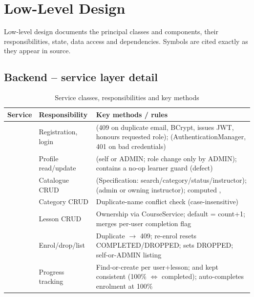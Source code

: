 \section{Low-Level Design}
\label{sec:low-level-design}

Low-level design documents the principal classes and components, their responsibilities, state, data access and dependencies. Symbols are cited exactly as they appear in source.

\subsection{Backend -- service layer detail}

\begin{table}[H]
\centering
\caption{Service classes, responsibilities and key methods}
\label{tab:lld-services}
\begin{tabular}{@{}L{3.0cm}L{5.4cm}L{5.8cm}@{}}
\toprule
\textbf{Service} & \textbf{Responsibility} & \textbf{Key methods / rules} \\
\midrule
{} & Registration, login &  (409 on duplicate email, BCrypt, issues JWT, honours requested role);  (AuthenticationManager, 401 on bad credentials) \\
 & Profile read/update &  (self or ADMIN; role change only by ADMIN);  contains a no-op learner guard (defect) \\
 & Catalogue CRUD &  (Specification: search/category/status/instructor);  (admin or owning instructor); computed ,  \\
 & Category CRUD & Duplicate-name conflict check (case-insensitive) \\
 & Lesson CRUD & Ownership via CourseService; default  = count+1; merges per-user completion flag \\
 & Enrol/drop/list & Duplicate  $\rightarrow$ 409; re-enrol resets COMPLETED/DROPPED;  sets DROPPED; self-or-ADMIN listing \\
 & Progress tracking & Find-or-create per user+lesson;  and  kept consistent (100\% $\Leftrightarrow$ completed); auto-completes enrolment at 100\% \\

\end{tabular}
\end{table}
